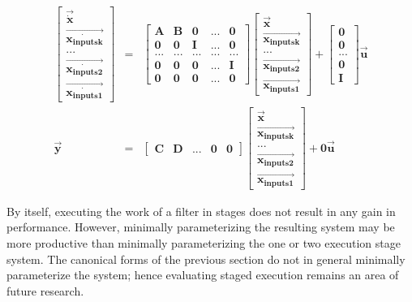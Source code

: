 \begin{eqnarray*}
\left [ \begin{array} {c} \vec{\dot{\mathbf{x}}} \\ \vec{\dot{\mathbf{x_{inputsk}}}} \\
... \\ \vec{\dot{\mathbf{x_{inputs2}}}} \\
\vec{\dot{\mathbf{x_{inputs1}}}}
\end{array} \right ] & = & \left [ \begin{array} {ccccc}
\mathbf{A} & \mathbf{B} & \mathbf{0} & ... &
\mathbf{0} \\ \mathbf{0} & \mathbf{0} & \mathbf{I} & ... & \mathbf{0} \\
... & ... & ... & ... & ... \\ \mathbf{0} & \mathbf{0} &
\mathbf{0} & ... & \mathbf{I} \\ \mathbf{0} & \mathbf{0} &
\mathbf{0} & ... & \mathbf{0} \end{array} \right ] \left [
\begin{array} {c} \vec{\mathbf{x}} \\ \vec{\mathbf{x_{inputsk}}} \\ ...
\\ \vec{\mathbf{x_{inputs2}}} \\ \vec{\mathbf{x_{inputs1}}} \end{array} \right ]
+ \left [ \begin{array} {c} \mathbf{0} \\ \mathbf{0} \\ ... \\
\mathbf{0} \\ \mathbf{I} \end{array} \right ]
\vec{\mathbf{u}} \\
\vec{\mathbf{y}} & = & \left [ \begin{array} {ccccc} \mathbf{C} &
\mathbf{D} & ... & \mathbf{0} & \mathbf{0} \end{array} \right ]
\left [ \begin{array} {c} \vec{\mathbf{x}}
\\ \vec{\mathbf{x_{inputsk}}} \\ ... \\ \vec{\mathbf{x_{inputs2}}}
\\ \vec{\mathbf{x_{inputs1}}} \end{array} \right ] + \mathbf{0} \vec{\mathbf{u}}
\end{eqnarray*}

    By itself, executing the work of a filter in stages does not
result in any gain in performance. However, minimally
parameterizing the resulting system may be more productive than
minimally parameterizing the one or two execution stage system.
The canonical forms of the previous section do not in general
minimally parameterize the system; hence evaluating staged
execution remains an area of future research.
